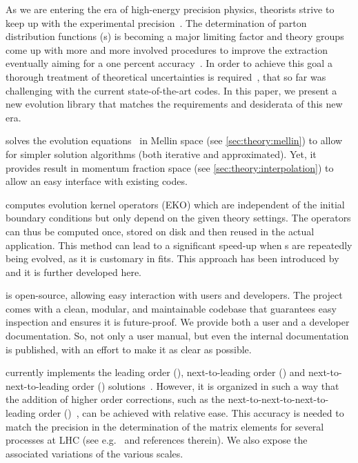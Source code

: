 
As we are entering the era of high-energy precision physics, theorists strive
to keep up with the experimental precision~\cite{Gao:2017yyd}.
The determination of parton distribution functions (\pdf{}s) is becoming
a major limiting factor and theory groups come up with more and more
involved procedures to improve the extraction~\cite{NNPDF:2017mvq,Hou:2019efy,Bailey:2020ooq}
eventually aiming for a one percent accuracy~\cite{NNPDF:2021njg}.
In order to achieve this goal a thorough treatment of theoretical
uncertainties is required~\cite{AbdulKhalek:2019ihb},
that so far was challenging with the current
state-of-the-art codes.
In this paper, we present \eko{} a new \qcd{} evolution library that matches
the requirements and desiderata of this new era.

\eko{} solves the evolution
equations~\cite{Altarelli:1977zs,Gribov:1972ri,Dokshitzer:1977sg} in Mellin
space (see \cref{sec:theory:mellin}) to allow for simpler solution algorithms
(both iterative and approximated).
Yet, it provides result in momentum fraction space (see
\cref{sec:theory:interpolation}) to allow an easy interface with existing
codes.

\eko{} computes evolution kernel operators (EKO) which are independent of
the initial boundary conditions but only depend on the given theory settings.
The operators can thus be computed once, stored on disk and then reused in the
actual application. This method can lead to a significant speed-up when \pdf{}s
are repeatedly being evolved, as it is customary in \pdf{} fits.
This approach has been introduced by \fk{}~\cite{Ball:2008by,Ball:2010de,DelDebbio:2007ee}
and it is further developed here.

\eko{} is open-source, allowing easy interaction with users
and developers.
The project comes with a clean, modular, and maintainable codebase that guarantees
easy inspection and ensures it is future-proof.
We provide both a user and a developer documentation. So, not only a user
manual, but even the internal documentation is published, with an effort to make
it as clear as possible.

\eko{} currently implements the leading order (\lo{}),
next-to-leading order (\nlo{}) and next-to-next-to-leading order (\nnlo{})
solutions~\cite{Vogt:2004mw,Moch:2004pa,Blumlein:2021enk}.
However, it is organized in such a way that the addition of higher order corrections,
such as the next-to-next-to-next-to-leading order (\nnnlo{})~\cite{Moch:2021qrk},
can be achieved with relative ease.
This accuracy is needed to match the precision in the determination of the
matrix elements for several processes at LHC (see e.g.\ \cite{Duhr:2021vwj} and
references therein).
We also expose the associated variations of the various scales.

